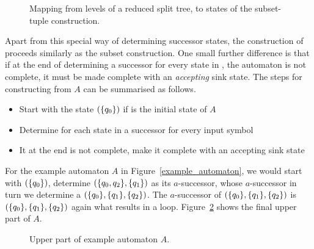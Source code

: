 \begin{figure}
\begin{center}
\Slices
\caption{Mapping from levels of a reduced split tree, to states of the subset-tuple construction.}
\label{levels_to_states}
\end{center}
\end{figure} 

Apart from this special way of determining successor states, the construction of \Bp proceeds similarly as the subset construction. One small further difference is that if at the end of determining a successor for every state in \Bp, the automaton is not complete, it must be made complete with an \emph{accepting} sink state. The steps for constructing \Bp from $A$ can be summarised as follows.

\begin{itemize}
\item Start with the state $(\{q_{0}\})$ if  is the initial state of $A$
\item Determine for each state in \Bp a successor for every input symbol
\item It at the end \Bp is not complete, make it complete with an accepting sink state
\end{itemize}

For the example automaton $A$ in Figure~\ref{example_automaton}, we would start with $(\{q_{0}\})$, determine $(\{q_{0},q_{2}\},\{q_{1}\})$ as its $a$-successor, whose $a$-successor in turn we determine a $(\{q_{0}\},\{q_{1}\},\{q_{2}\})$. The $a$-successor of $(\{q_{0}\},\{q_{1}\},\{q_{2}\})$ is $(\{q_{0}\},\{q_{1}\},\{q_{2}\})$ again what results in a loop. Figure~\ref{upper_part} shows the final upper part \Bp of $A$.

\begin{figure}
\begin{center}
\UpperPart
\caption{Upper part \Bp of example automaton $A$.}
\label{upper_part}
\end{center}
\end{figure} 


